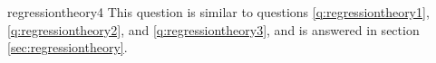 \begin{answer}{regressiontheory4}
This question is similar to questions
\ref{q:regressiontheory1},
\ref{q:regressiontheory2}, and
\ref{q:regressiontheory3}, and is answered in section \ref{sec:regressiontheory}.
\end{answer}
